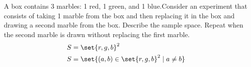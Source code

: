 \item
A box contains 3 marbles: 1 red, 1 green, and 1 blue.Consider an experiment that consists of taking 1 marble from the box and then replacing it in the box and drawing a second marble from the box. Describe the sample space. Repeat when the second marble is drawn without replacing the first marble.
\begin{alignat*}{3}
    S &= \set{r,g,b}^2\\
    S &= \set{ (a, b) \in \set{r,g,b}^2 \mid a \ne b}
\end{alignat*}